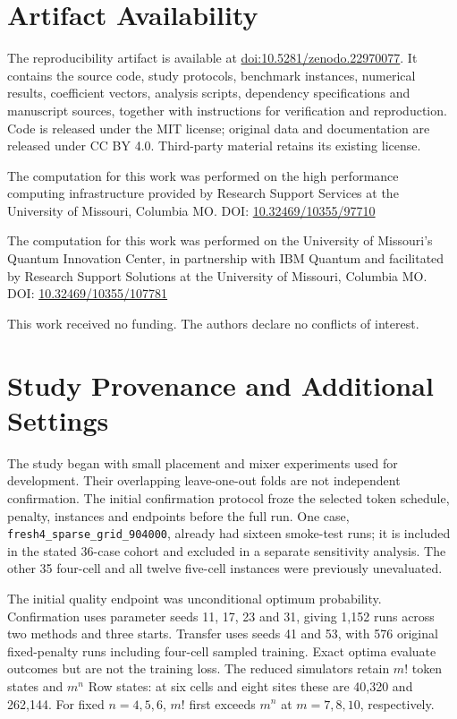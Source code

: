 \documentclass[manuscript,screen,review]{acmart}
\begin{document}
\section{Artifact Availability}
The reproducibility artifact is available at
\href{https://doi.org/10.5281/zenodo.22970077}{doi:10.5281/zenodo.22970077}.
It contains the source code, study protocols, benchmark instances, numerical
results, coefficient vectors, analysis scripts, dependency specifications
and manuscript sources, together with instructions for verification and
reproduction. Code is released under the MIT license; original data and
documentation are released under CC BY 4.0. Third-party material retains
its existing license.

\begin{acks}
The computation for this work was performed on the high performance computing
infrastructure provided by Research Support Services at the University of
Missouri, Columbia MO. DOI: \href{https://doi.org/10.32469/10355/97710}{10.32469/10355/97710}

The computation for this work was performed on the University of Missouri's
Quantum Innovation Center, in partnership with IBM Quantum and facilitated
by Research Support Solutions at the University of Missouri, Columbia MO.
DOI: \href{https://doi.org/10.32469/10355/107781}{10.32469/10355/107781}

This work received no funding. The authors declare no conflicts of interest.
\end{acks}

\appendix
\section{Study Provenance and Additional Settings}
\label{sec:provenance}
The study began with small placement and mixer experiments used for
development. Their overlapping leave-one-out folds are not independent
confirmation. The initial confirmation protocol froze the selected token
schedule, penalty, instances and endpoints before the full run. One case,
\texttt{fresh4\_sparse\_grid\_904000}, already had sixteen smoke-test runs;
it is included in the stated 36-case cohort and excluded in a separate
sensitivity analysis. The other 35 four-cell and all twelve five-cell
instances were previously unevaluated.

The initial quality endpoint was unconditional optimum probability.
Confirmation uses parameter seeds 11, 17, 23 and 31, giving 1,152 runs
across two methods and three starts. Transfer uses seeds 41 and 53, with
576 original fixed-penalty runs including four-cell sampled training.
Exact optima evaluate outcomes but are not the training loss. The reduced
simulators retain $m!$ token states and $m^n$ Row states: at six cells and
eight sites these are 40,320 and 262,144. For fixed $n=4,5,6$, $m!$ first
exceeds $m^n$ at $m=7,8,10$, respectively.
\end{document}

